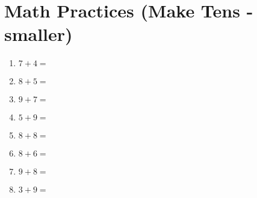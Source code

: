 \documentclass[a4paper,12pt]{article}
\begin{document}
\newpage
\section*{\huge \center\textbf{Math Practices (Make Tens - smaller)}}
\vspace{1 cm}
\begin{multicols}{2}
\begin{enumerate}[label=\arabic*.]
    \item \textbf{\Large $7 + 4 =$} \underline{\hspace{2cm}} \vspace{1.5 cm}
    \item \textbf{\Large $8 + 5 =$} \underline{\hspace{2cm}} \vspace{1.5cm}
    \item \textbf{\Large $9 + 7 =$} \underline{\hspace{2cm}} \vspace{1.5cm}
    \item \textbf{\Large $5 + 9 =$} \underline{\hspace{2cm}} \vspace{1.5cm}
    \item \textbf{\Large $8 + 8 =$} \underline{\hspace{2cm}} \vspace{1.5cm}
    \item \textbf{\Large $8 + 6 =$} \underline{\hspace{2cm}} \vspace{1.5cm}
    \item \textbf{\Large $9 + 8 =$} \underline{\hspace{2cm}} \vspace{1.5cm}
    \item \textbf{\Large $3 + 9 =$} \underline{\hspace{2cm}} \vspace{1.5cm} %

\end{enumerate}
\end{multicols}
\end{document}

